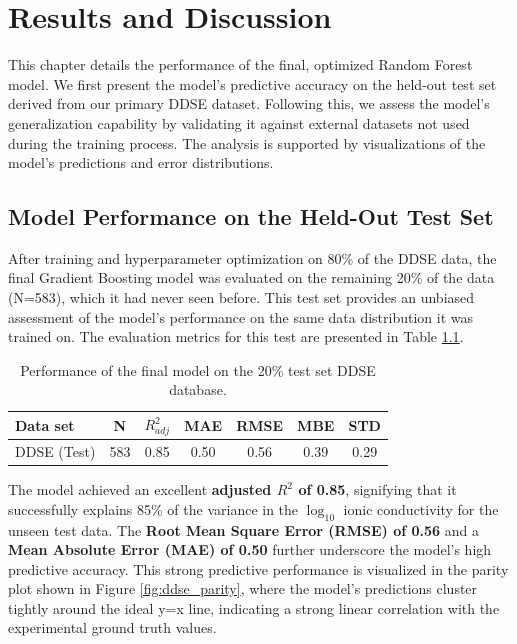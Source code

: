 \chapter{Results and Discussion}
This chapter details the performance of the final, optimized Random Forest model. We first present the model's predictive accuracy on the held-out test set derived from our primary DDSE dataset. Following this, we assess the model's generalization capability by validating it against external datasets not used during the training process. The analysis is supported by visualizations of the model's predictions and error distributions.

\section{Model Performance on the Held-Out Test Set}

After training and hyperparameter optimization on 80\% of the DDSE data, the final Gradient Boosting model was evaluated on the remaining 20\% of the data (N=583), which it had never seen before. This test set provides an unbiased assessment of the model's performance on the same data distribution it was trained on. The evaluation metrics for this test are presented in Table \ref{tab:test_results}.

\begin{table}[h!]
\centering
\caption{Performance of the final model on the 20\% test set DDSE database.}
\label{tab:test_results}
\begin{tabular}{lcccccc}
\hline
\textbf{Data set} & \textbf{N} & \textbf{\(R^2_{adj}\)} & \textbf{MAE} & \textbf{RMSE} & \textbf{MBE} & \textbf{STD} \\
\hline
DDSE (Test)       & 583        & 0.85                  & 0.50         & 0.56          & 0.39         & 0.29         \\
\hline
\end{tabular}
\end{table}

The model achieved an excellent \textbf{adjusted $R^2$ of 0.85}, signifying that it successfully explains 85\% of the variance in the $\log_{10}$ ionic conductivity for the unseen test data. The \textbf{Root Mean Square Error (RMSE) of 0.56} and a \textbf{Mean Absolute Error (MAE) of 0.50} further underscore the model's high predictive accuracy. This strong predictive performance is visualized in the parity plot shown in Figure \ref{fig:ddse_parity}, where the model's predictions cluster tightly around the ideal y=x line, indicating a strong linear correlation with the experimental ground truth values.

